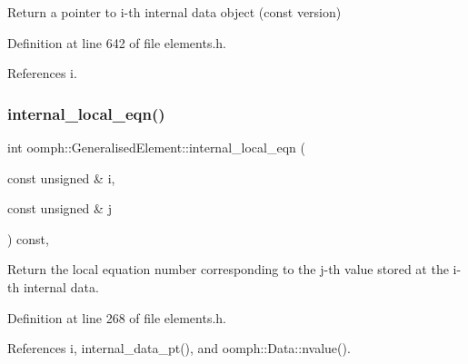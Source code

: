 Return a pointer to i-\/th internal data object (const version) 



Definition at line 642 of file elements.\+h.



References i.

\mbox{\label{classoomph_1_1GeneralisedElement_a967d667f536c45878106b69563971f31}} 
\subsubsection{\texorpdfstring{internal\+\_\+local\+\_\+eqn()}{internal\_local\_eqn()}}
{\footnotesize\ttfamily int oomph\+::\+Generalised\+Element\+::internal\+\_\+local\+\_\+eqn (\begin{DoxyParamCaption}\item[{const unsigned \&}]{i,  }\item[{const unsigned \&}]{j }\end{DoxyParamCaption}) const\hspace{0.3cm}{\ttfamily [inline]}, {\ttfamily [protected]}}



Return the local equation number corresponding to the j-\/th value stored at the i-\/th internal data. 



Definition at line 268 of file elements.\+h.



References i, internal\+\_\+data\+\_\+pt(), and oomph\+::\+Data\+::nvalue().



